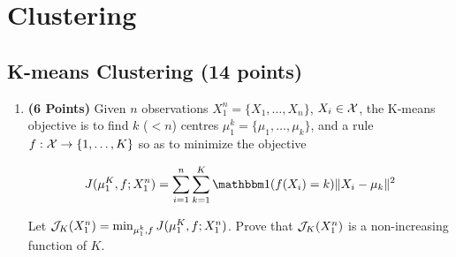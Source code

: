 \section{Clustering}

\subsection{K-means Clustering (14 points)}

\begin{enumerate}

\item \textbf{(6 Points)}
Given $n$ observations $X_1^n = \{X_1, \dots, X_n\}$, $X_i \in \mathcal{X}$, the K-means objective
is to find $k$
($<n$) centres $\mu_1^k = \{\mu_1, \dots, \mu_k\}$, and a rule $f:\mathcal{X} \rightarrow
\{1,\dots, K\}$ so as to minimize the objective

\begin{equation}
J(\mu_1^K, f; X_1^n) = \sum_{i=1}^n \sum_{k=1}^K \indfone(f(X_i) = k) \|X_i - \mu_k\|^2
\label{eqn:kmeans}
\end{equation}

Let $\mathcal{J}_K(X_1^n) = \min_{\mu_1^k, f} J(\mu_1^K, f; X_1^n)$. Prove that
$\mathcal{J}_{K}(X_1^n)$ is a non-increasing function of $K$.


\end{enumerate}
